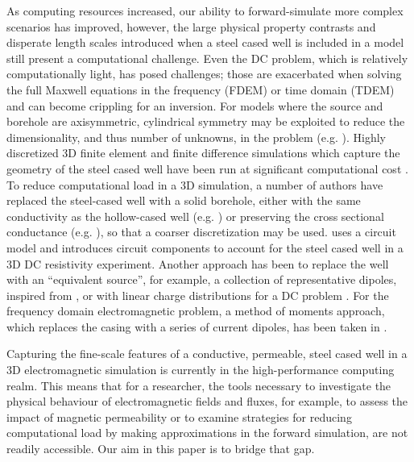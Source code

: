 As computing resources increased, our ability to forward-simulate more complex scenarios has improved, however, the large physical property contrasts and disperate length scales introduced when a steel cased well is included in a model still present a computational challenge. Even the DC problem, which is relatively computationally light, has posed challenges; those are exacerbated when solving the full Maxwell equations in the frequency (FDEM) or time domain (TDEM) and can become crippling for an inversion. For models where the source and borehole are axisymmetric, cylindrical symmetry may be exploited to reduce the dimensionality, and thus number of unknowns, in the problem (e.g. \citep{Pardo2013, Heagy2015}). Highly discretized 3D finite element and finite difference simulations which capture the geometry of the steel cased well have been run at significant computational cost \citep{Commer2015}. To reduce computational load in a 3D simulation, a number of authors have replaced the steel-cased well with a solid borehole, either with the same conductivity as the hollow-cased well (e.g. \citep{Um2015, Puzyrev2017}) or preserving the cross sectional conductance (e.g. \citep{Swidinsky2013}), so that a coarser discretization may be used. \citep{Yang2016} uses a circuit model and introduces circuit components to account for the steel cased well in a 3D DC resistivity experiment. Another approach has been to replace the well with an ``equivalent source'', for example, a collection of representative dipoles, inspired from \citep{cuevas2014}, or with linear charge distributions for a DC problem \citep{Weiss2016}. For the frequency domain electromagnetic problem, a method of moments approach, which replaces the casing with a series of current dipoles, has been taken in \citep{Kohnke2017}.

Capturing the fine-scale features of a conductive, permeable, steel cased well in a 3D electromagnetic simulation is currently in the high-performance computing realm. This means that for a researcher, the tools necessary to investigate the physical behaviour of electromagnetic fields and fluxes, for example, to assess the impact of magnetic permeability or to examine strategies for reducing computational load by making approximations in the forward simulation, are not readily accessible. Our aim in this paper is to bridge that gap.


